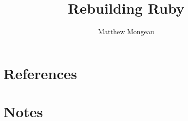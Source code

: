 \documentclass[oneside]{book}
\date{}
\begin{document}
\title{Rebuilding Ruby}
\author{Matthew Mongeau}
\maketitle

\frontmatter
\tableofcontents


\mainmatter




\appendix
\chapter{References}

\backmatter
\chapter{Notes}
\end{document}

